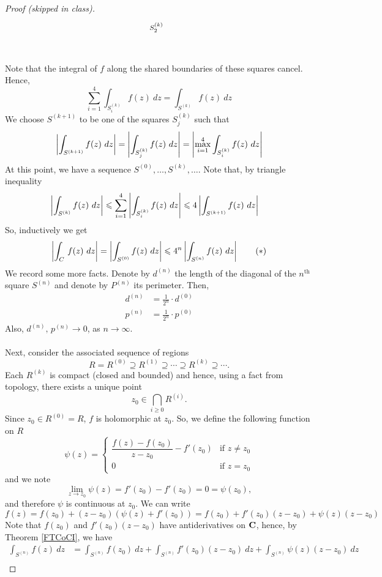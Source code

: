 \begin{proof}[Proof (skipped in class)]
\[\begin{tikzpicture}[scale=0.7]
    \node[label=above left:{\footnotesize$S_2^{(k)}$}](A) at (-1.5,1.5) {};
\end{tikzpicture}\]\\
Note that the integral of $f$ along the shared boundaries of these squares cancel. Hence, 
\[\sum_{i=1}^4\int_{S^{(k)}_i}f(z)\ dz = \int_{S^{(k)}}f(z)\ dz\]
We choose $S^{(k+1)}$ to be one of the squares $S^{(k)}_j$ such that 
\[\abs{\int_{S^{(k+1)}}f(z)\ dz} = \abs{\int_{S^{(k)}_j}f(z)\ dz} = \abs{\max_{i=1}^4\int_{S^{(k)}_i}f(z)\ dz}\]
At this point, we have a sequence $S^{(0)},\ldots,S^{(k)},\ldots$. Note that, by triangle inequality
\begin{align*}
\left\lvert\int_{S^{(k)}}f(z)\ dz\right\rvert & \leqslant \sum_{i=1}^4\left\lvert\int_{S^{(k)}_i}f(z)\ dz\right\rvert \leqslant 4\left\lvert\int_{S^{(k+1)}}f(z)\ dz\right\rvert
\end{align*}
So, inductively we get
\[\left\lvert\int_{C}\,f(z)\ dz\right\rvert = \left\lvert\int_{S^{(0)}}f(z)\ dz\right\rvert \leqslant 4^n\left\lvert\int_{S^{(n)}}f(z)\ dz\right\rvert \tag{$*$}\]
We record some more facts. Denote by $d^{(n)}$ the length of the diagonal of the $n^{\text{th}}$ square $S^{(n)}$ and denote by $P^{(n)}$ its perimeter. Then,
\begin{align*}
d^{(n)} &= \frac{1}{2^n}\cdot d^{(0)}\\[0.5em]
p^{(n)} &= \frac{1}{2^n}\cdot p^{(0)}
\end{align*}
Also, $d^{(n)},\,p^{(n)} \to 0$, as $n \to \infty$.\\
\\
Next, consider the associated sequence of regions
\[R = R^{(0)} \supseteq R^{(1)} \supseteq \cdots \supseteq R^{(k)} \supseteq \cdots.\]
Each $R^{(k)}$ is compact (closed and bounded) and hence, using a fact from topology, there exists a unique point
\[z_0 \in \bigcap_{i\geq 0}R^{(i)}.\]
Since $z_0 \in R^{(0)} = R$, $f$ is holomorphic at $z_0$. So, we define the following function on $R$
\[\psi(z) = \begin{cases} \dfrac{f(z) - f(z_0)}{z - z_0} - f'(z_0) & \text{if $z \neq z_0$}\\[1em] 0 & \text{if $z = z_0$} \end{cases}\]
and we note
\[\lim_{z \to z_0}\psi(z) = f'(z_0) - f'(z_0) = 0 = \psi(z_0),\]
and therefore $\psi$ is continuous at $z_0$. We can write
\[f(z) = f(z_0) + (z-z_0)(\psi(z) + f'(z_0)) = f(z_0) + f'(z_0)(z - z_0) + \psi(z)(z - z_0)\]
Note that $f(z_0)$ and $f'(z_0)(z - z_0)$ have antiderivatives on $\mathbf C$, hence, by Theorem \ref{FTCoCI}, we have
\begin{align*}
\int_{S^{(n)}}f(z)\ dz &= \int_{S^{(n)}}f(z_0)\ dz + \int_{S^{(n)}}f'(z_0)(z - z_0)\ dz + \int_{S^{(n)}}\psi(z)(z - z_0)\ dz\\[1em]

\end{align*}
\end{proof}
